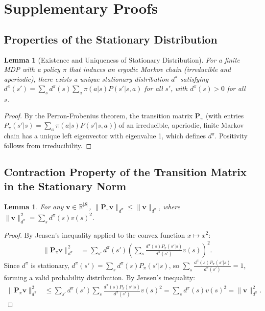 \documentclass[11pt,a4paper]{article}
\theoremstyle{definition}
\theoremstyle{plain}
\newtheorem{lemma}[theorem]{Lemma}
\theoremstyle{remark}
\newcommand{\R}{\mathbb{R}}
\begin{document}
\section{Supplementary Proofs}
\label{app:supplementary}

\subsection{Properties of the Stationary Distribution}
\label{app:stationary}

\begin{lemma}[Existence and Uniqueness of Stationary Distribution]
\label{lem:stationary}
For a finite MDP with a policy $\pi$ that induces an ergodic Markov chain (irreducible and aperiodic), there exists a unique stationary distribution $d^\pi$ satisfying $d^\pi(s') = \sum_s d^\pi(s) \sum_a \pi(a|s) P(s'|s,a)$ for all $s'$, with $d^\pi(s) > 0$ for all $s$.
\end{lemma}

\begin{proof}
By the Perron-Frobenius theorem, the transition matrix $\bm{P}_\pi$ (with entries $P_\pi(s'|s) = \sum_a \pi(a|s) P(s'|s,a)$) of an irreducible, aperiodic, finite Markov chain has a unique left eigenvector with eigenvalue 1, which defines $d^\pi$. Positivity follows from irreducibility.
\end{proof}

\subsection{Contraction Property of the Transition Matrix in the Stationary Norm}
\label{app:contraction_dpinorm}

\begin{lemma}
\label{lem:ppinorm}
For any $\bm{v} \in \R^{|\mathcal{S}|}$, $\|\bm{P}_\pi \bm{v}\|_{d^\pi} \leq \|\bm{v}\|_{d^\pi}$, where $\|\bm{v}\|_{d^\pi}^2 = \sum_s d^\pi(s) v(s)^2$.
\end{lemma}

\begin{proof}
By Jensen's inequality applied to the convex function $x \mapsto x^2$:
\begin{align}
    \|\bm{P}_\pi \bm{v}\|_{d^\pi}^2
    &= \sum_{s'} d^\pi(s') \!\left(\sum_s \frac{d^\pi(s) P_\pi(s'|s)}{d^\pi(s')} v(s)\right)^2. \label{eq:ppi_step1}
\end{align}
Since $d^\pi$ is stationary, $d^\pi(s') = \sum_s d^\pi(s) P_\pi(s'|s)$, so $\sum_s \frac{d^\pi(s) P_\pi(s'|s)}{d^\pi(s')} = 1$, forming a valid probability distribution. By Jensen's inequality:
\begin{align}
    \|\bm{P}_\pi \bm{v}\|_{d^\pi}^2
    &\leq \sum_{s'} d^\pi(s') \sum_s \frac{d^\pi(s)P_\pi(s'|s)}{d^\pi(s')} v(s)^2
    = \sum_s d^\pi(s) v(s)^2 = \|\bm{v}\|_{d^\pi}^2. \label{eq:ppi_jensen}
\end{align}
\end{proof}
\end{document}
